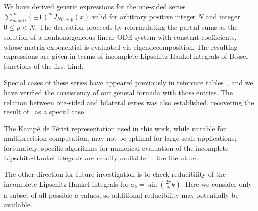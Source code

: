 \documentclass{article}
\begin{document}
We have derived generic expressions for the one-sided series
$\sum_{m=0}^{\infty} (\pm 1)^m J_{Nm+p}(x)$
valid for arbitrary positive integer $N$ and integer $0 \le p < N$.
The derivation proceeds by reformulating the partial sums as the solution of a nonhomogeneous linear ODE system with constant coefficients, whose matrix exponential is evaluated via eigendecomposition.
The resulting expressions are given in terms of incomplete Lipschitz-Hankel integrals of Bessel functions of the first kind.

Special cases of these series have appeared previously in reference tables~\cite{Gradshteyn2014,Abramowitz1965,Prudnikov1986}, and we have verified the consistency of our general formula with those entries.
The relation between one-sided and bilateral series was also established, recovering the result of~\cite{Sung2022} as a special case.

The Kamp\'e de F\'eriet representation used in this work, while suitable for multiprecision computation, may not be optimal for large-scale applications; fortunately, specific algorithms for numerical evaluation of the incomplete Lipschitz-Hankel integrals are readily available in the literature.

The other direction for future investigation is to check reducibility of the incomplete Lipschitz-Hankel integrals for $a_k=\sin(\frac{2\pi}{N}k)$.
Here we consider only a subset of all possible $a$ values, so additional reducibility may potentially be available.


\printbibliography
\end{document}
